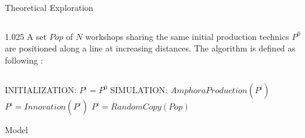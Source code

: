 \documentclass[final]{beamer}
\newlength{\sepwid}
\newlength{\onecolwid}
\newlength{\twocolwid}
\begin{document}
\begin{frame}[t]
\begin{columns}[t]
\begin{column}{\twocolwid}
\begin{block}{Theoretical Exploration}
\begin{columns}[t,totalwidth=\twocolwid]
\begin{column}{1.025\onecolwid}
A set $Pop$ of $N$ workshops sharing the same initial production technics $P^{0}$ are positioned along a line at increasing distances.%
 The algorithm is defined as following : %
\vspace{.7cm}

\begin{columns}
	    \centering
%	    
    \begin{column}{.9\textwidth}
	\begin{algorithm}[H]
	    \begin{algorithmic}
		\footnotesize
		\State INITIALIZATION:
		\State $P^{i} = P^{0}$
		\EndFor
		\State SIMULATION:
		\State $AmphoraProduction(P^{i})$
		\State $P^{i}=Innovation(P^{i})$ 
		\State $P^{i}=RandomCopy(Pop)$	
		\EndIf
		\EndFor
		\EndLoop
	    \end{algorithmic}
	    \caption{Model }
	    \label{fig:mod}
	\end{algorithm}
   \end{column}
\end{columns}






\end{column}



\end{columns}
\end{block}
\end{column}
\end{columns}
\end{frame}
\end{document}

